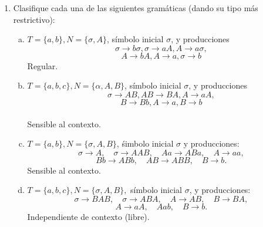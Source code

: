 \documentclass{article}
\begin{document}
\begin{enumerate}[1.]
\item
Clasifique cada una de las siguientes gramáticas (dando su tipo más restrictivo):
  \begin{enumerate}[a)]
    \item
      $T = \{ a,b\}, N = \{ \sigma, A\}$, símbolo inicial $\sigma$, y producciones
      \[ \sigma \rightarrow b\sigma, \sigma \rightarrow aA, A \rightarrow a\sigma,\]
      \[ A \rightarrow bA, A \rightarrow a, \sigma \rightarrow b\]
      Regular.
    \item 
      $T = \{ a,b,c \}, N = \{ \alpha,A,B\}$, símbolo inicial $\sigma$, y producciones
      \[ \sigma \rightarrow AB, AB \rightarrow BA, A \rightarrow aA,\]
      \[ B \rightarrow Bb, A \rightarrow a, B \rightarrow b\] \\
       Sensible al contexto.
    \item
      $T = \{ a,b\}, N = \{ \sigma, A,B\}$, śimbolo inicial $\sigma$ y producciones:
      \[ \sigma \rightarrow A, \quad \sigma \rightarrow AAB,\quad Aa \rightarrow ABa, \quad A \rightarrow aa,\]
      \[ Bb \rightarrow ABb, \quad AB \rightarrow ABB, \quad B \rightarrow b.\]
      Sensible al contexto.
    \item
      $T = \{ a,b,c \}, N = \{\sigma,A,B \},$ símbolo inicial $\sigma$, y producciones:
      \[ \sigma \rightarrow BAB, \quad \sigma \rightarrow ABA, \quad A \rightarrow AB, \quad B \rightarrow BA,\]
      \[A \rightarrow aA, \quad A ab, \quad B \rightarrow b.\]
      Independiente de contexto (libre).
  \end{enumerate}
\end{enumerate}
\end{document}
